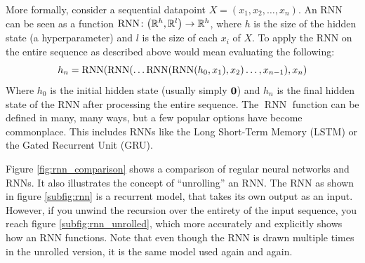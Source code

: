More formally, consider a sequential datapoint $X = (x_1, x_2, \dots, x_n)$. An RNN can be seen as a function $\mathrm{RNN} \colon {\mathopen{} \left( \mathbb{R}^h, \mathbb{R}^l \right) \mathclose{}} \to \mathbb{R}^h$, where $h$ is the size of the hidden state (a hyperparameter) and $l$ is the size of each $x_i$ of $X$. To apply the RNN on the entire sequence as described above would mean evaluating the following:
\[h_n = \mathrm{RNN}{\mathopen{} \left( \mathrm{RNN}{\mathopen{} \left( \dots \mathrm{RNN}{\mathopen{} \left( \mathrm{RNN}{\mathopen{} \left( h_0, x_1 \right) \mathclose{}}, x_2 \right) \mathclose{}} \dots, x_{n - 1} \right) \mathclose{}}, x_n \right) \mathclose{}}\]
Where $h_0$ is the initial hidden state (usually simply $\bm{ 0 }$) and $h_n$ is the final hidden state of the RNN after processing the entire sequence. The $\operatorname{RNN}$ function can be defined in many, many ways, but a few popular options have become commonplace. This includes RNNs like the Long Short-Term Memory (LSTM) or the Gated Recurrent Unit (GRU).

Figure \ref{fig:rnn_comparison} shows a comparison of regular neural networks and RNNs. It also illustrates the concept of ``unrolling'' an RNN. The RNN as shown in figure \ref{subfig:rnn} is a recurrent model, that takes its own output as an input. However, if you unwind the recursion over the entirety of the input sequence, you reach figure \ref{subfig:rnn_unrolled}, which more accurately and explicitly shows how an RNN functions. Note that even though the RNN is drawn multiple times in the unrolled version, it is the same model used again and again.

